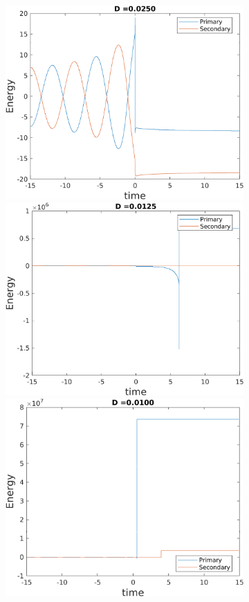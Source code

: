 \documentclass[a4paper]{article}
\begin{document}
\begin{enumerate} [label*=\textbf{(\alph*)}]
\begin{figure} [h]
\begin{subfigure} {.425\linewidth}
						\vspace{1.5mm}
						\includegraphics[width=\linewidth, height =.55\linewidth] {../plots/3f/retrograde_energies/3.png}\\
						\vspace{1.5mm}
						\includegraphics[width=\linewidth, height =.55\linewidth] {../plots/3f/retrograde_energies/2.png}\\
						\vspace{1.5mm}
						\includegraphics[width=\linewidth, height =.55\linewidth] {../plots/3f/retrograde_energies/1.png}

\end{subfigure}
\end{figure}
\end{enumerate}
\end{document}
